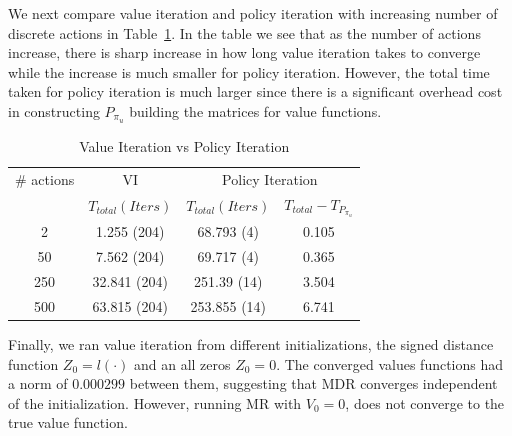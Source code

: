We next compare value iteration and policy iteration with increasing number of discrete actions in Table~\ref{tab:v_vs_p}. In the table we see that as the number of actions increase, there is sharp increase in how long value iteration takes to converge while the increase is much smaller for policy iteration. However, the total time taken for policy iteration is much larger since there is a significant overhead cost in constructing $P_{\pi_u}$ building the matrices for value functions. 
\begin{table}
\centering
\caption{Value Iteration vs Policy Iteration}
\label{tab:v_vs_p}
\begin{tabular}{|c| c| c| c|}
\hline
\# actions & VI & \multicolumn{2}{|c|}{Policy Iteration} \\ \cline{3-4}
 &  $T_{total} (Iters)$ & $T_{total}(Iters)$ & $T_{total} - T_{P_{\pi_u}}$ \\ \hline
2 & 1.255 (204) & 68.793 (4) & 0.105 \\ \hline
50 &  7.562 (204)&  69.717 (4)& 0.365 \\ \hline
250 & 32.841 (204)&  251.39 (14)& 3.504 \\ \hline
500 & 63.815 (204)&  253.855 (14)& 6.741 \\
\hline
\end{tabular}
\end{table}

Finally, we ran value iteration from different initializations, the signed distance function $Z_0 = l(\cdot)$ and an all zeros $Z_0= 0$. The converged values functions had a norm of $0.000299$ between them, suggesting that MDR converges independent of the initialization. However, running MR with $V_0 = 0$, does not converge to the true value function.